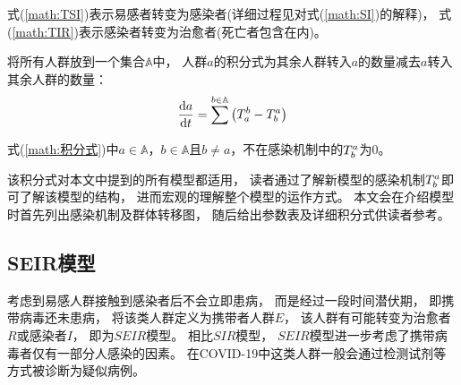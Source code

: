 \par 式(\ref{math:TSI})表示易感者转变为感染者(详细过程见对式(\ref{math:SI})的解释)，
式(\ref{math:TIR})表示感染者转变为治愈者(死亡者包含在内)。
\par 将所有人群放到一个集合$\mathbb{A}$中，
人群$a$的积分式为其余人群转入$a$的数量减去$a$转入其余人群的数量：
\begin{equation}
    \frac{\mathrm{d}a}{\mathrm{d}t} = \sum^{b\in \mathbb{A}}\left(T^{b}_{a}-T^{a}_{b}\right)\label{math:积分式}
\end{equation}
\par 式(\ref{math:积分式})中$a\in\mathbb{A}$，$b\in\mathbb{A}$且$b\not=a$，不在感染机制中的$T^{a}_{b}$为$0$。
\par 该积分式对本文中提到的所有模型都适用，
读者通过了解新模型的感染机制$T^{a}_{b}$即可了解该模型的结构，
进而宏观的理解整个模型的运作方式。
本文会在介绍模型时首先列出感染机制及群体转移图，
随后给出参数表及详细积分式供读者参考。
\subsection{SEIR模型\label{sec:SEIR}}
\par 考虑到易感人群接触到感染者后不会立即患病，
而是经过一段时间潜伏期，
即携带病毒还未患病，
将该类人群定义为携带者人群$E$，
该人群有可能转变为治愈者$R$或感染者$I$，
即为$SEIR$模型。
相比$SIR$模型，
$SEIR$模型进一步考虑了携带病毒者仅有一部分人感染的因素。
在COVID-19中这类人群一般会通过检测试剂等方式被诊断为疑似病例。
